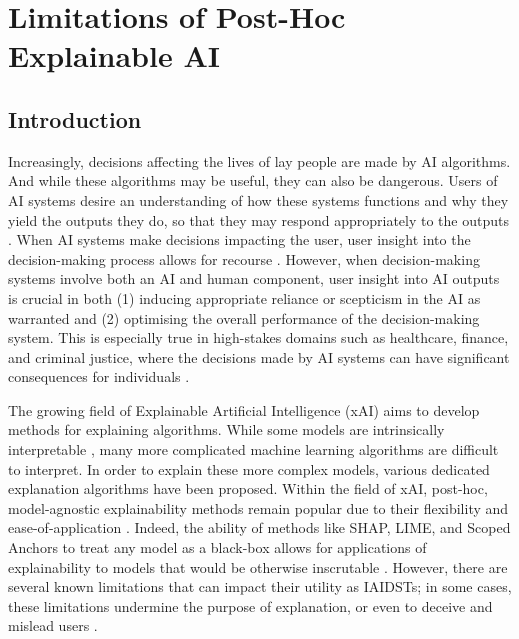 

\chapter{\label{ch:3-xailimitations}Limitations of Post-Hoc Explainable AI}

\minitoc

\section{Introduction}
Increasingly, decisions affecting the lives of lay people are made by AI algorithms. And while these algorithms may be useful, they can also be dangerous. Users of AI systems desire an understanding of how these systems functions and why they yield the outputs they do, so that they may respond appropriately to the outputs \cite{binns_human_2022}. When AI systems make decisions impacting the user, user insight into the decision-making process allows for recourse \cite{ustun_actionable_2019}. However, when decision-making systems involve both an AI and human component, user insight into AI outputs is crucial in both (1) inducing appropriate reliance or scepticism in the AI as warranted and (2) optimising the overall performance of the decision-making system. This is especially true in high-stakes domains such as healthcare, finance, and criminal justice, where the decisions made by AI systems can have significant consequences for individuals \cite{binns_human_2022,ustun_actionable_2019,wachter_counterfactual_2017}.

The growing field of Explainable Artificial Intelligence (xAI) aims to develop methods for explaining algorithms. While some models are intrinsically interpretable \cite{rudin_interpretable_2021}, many more complicated machine learning algorithms are difficult to interpret. In order to explain these more complex models, various dedicated explanation algorithms have been proposed. Within the field of xAI, post-hoc, model-agnostic explainability methods remain popular due to their flexibility and ease-of-application \cite{molnar_interpretable_2019}. Indeed, the ability of methods like SHAP, LIME, and Scoped Anchors to treat any model as a black-box allows for applications of explainability to models that would be otherwise inscrutable \cite{lundberg_unified_2017,ribeiro_why_2016,ribeiro_anchors_2018}. However, there are several known limitations that can impact their utility as IAIDSTs; in some cases, these limitations undermine the purpose of explanation, or even to deceive and mislead users \cite{wang_transparency_2022}. 

